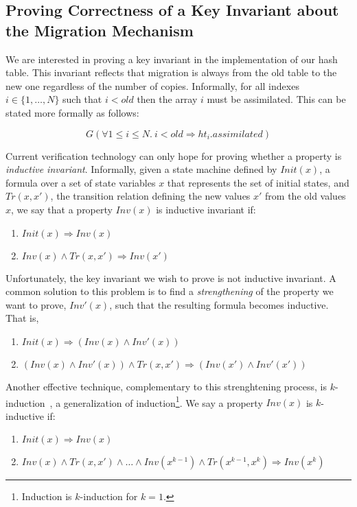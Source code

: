 \subsection{Proving Correctness of a Key Invariant about the Migration Mechanism}

We are interested in proving a key invariant in the implementation of
our hash table. This invariant reflects that migration is always from
the old table to the new one regardless of the number of
copies. Informally, for all indexes $i \in \{1, \ldots, N\}$ such that
$i < old$ then the array $i$ must be assimilated. This can be stated
more formally as follows:

  \[ G(\forall 1 \leq i \leq N.~ i < old \Rightarrow ht_{i}.assimilated) \]

Current verification technology can only hope for proving whether a
property is \emph{inductive invariant}. Informally, given a state
machine defined by $Init(x)$, a formula over a set of state variables
$x$ that represents the set of initial states, and $Tr(x,x')$, the
transition relation defining the new values $x'$ from the old values
$x$, we say that a property $Inv(x)$ is inductive invariant if:

\begin{enumerate}
\item $Init(x) \Rightarrow Inv(x)$
\item $Inv(x) \wedge Tr(x,x') \Rightarrow Inv(x')$
\end{enumerate}

Unfortunately, the key invariant we wish to prove is not inductive
invariant. A common solution to this problem is to find a
\emph{strengthening} of the property we want to prove, $Inv'(x)$, such
that the resulting formula becomes inductive. That is,

\begin{enumerate}
\item $Init(x) \Rightarrow (Inv(x) \wedge Inv'(x))$
\item $(Inv(x) \wedge Inv'(x)) \wedge Tr(x,x') \Rightarrow (Inv(x') \wedge Inv'(x'))$
\end{enumerate}

Another effective technique, complementary to this strenghtening
process, is $k$-induction~\cite{MouraRS03}, a generalization of
induction\footnote{Induction is $k$-induction for $k=1$.}. We say a
property $Inv(x)$ is $k$-inductive if:

\begin{enumerate}
\item $Init(x) \Rightarrow Inv(x)$
\item $Inv(x) \wedge Tr(x,x') \wedge \ldots \wedge Inv(x^{k-1}) \wedge Tr(x^{k-1},x^{k}) \Rightarrow Inv(x^{k})$
\end{enumerate}



